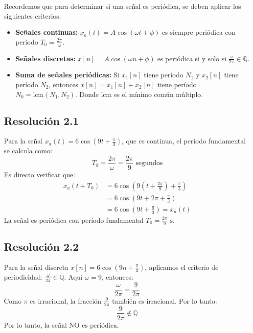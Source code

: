 \documentclass[
  11pt,
  letterpaper,
   addpoints,
  ]{exam}
\begin{document}
\begin{questions}
\begin{solution}

Recordemos que para determinar si una señal es periódica, se deben aplicar los siguientes criterios:

\begin{itemize}
\item \textbf{Señales continuas:} $x_a(t) = A\cos(\omega t + \phi)$ es siempre periódica con período $T_0 = \frac{2\pi}{\omega}$.
\item \textbf{Señales discretas:} $x[n] = A\cos(\omega n + \phi)$ es periódica si y solo si $\frac{\omega}{2\pi} \in \mathbb{Q}$.
\item \textbf{Suma de señales periódicas:} Si $x_1[n]$ tiene período $N_1$ y $x_2[n]$ tiene período $N_2$, entonces $x[n] = x_1[n] + x_2[n]$ tiene período $N_0 = \text{lcm}(N_1, N_2)$. Donde $\text{lcm}$ es el mínimo común múltiplo.
\end{itemize}
\subsection*{Resolución 2.1}

Para la señal $x_a(t) = 6\cos\!\left(9t+\tfrac{\pi}{3}\right)$, que es continua, el período fundamental se calcula como:
\begin{equation}
T_0 = \frac{2\pi}{\omega} = \frac{2\pi}{9} \text{ segundos}
\end{equation}
Es directo verificar que:
\begin{align}
x_a(t + T_0) &= 6\cos\!\left(9\left(t + \frac{2\pi}{9}\right) + \frac{\pi}{3}\right) \\
&= 6\cos\!\left(9t + 2\pi + \frac{\pi}{3}\right) \\
&= 6\cos\!\left(9t + \frac{\pi}{3}\right) = x_a(t)
\end{align}
La señal es periódica con período fundamental $\boxed{T_0 = \frac{2\pi}{9} \text{ s}}$.

\subsection*{Resolución 2.2}

Para la señal discreta $x[n] = 6\cos\!\left(9n+\tfrac{\pi}{3}\right)$, aplicamos el criterio de periodicidad: $\frac{\omega}{2\pi} \in \mathbb{Q}$. Aquí $\omega = 9$, entonces:
\begin{equation}
\frac{\omega}{2\pi} = \frac{9}{2\pi}
\end{equation}
Como $\pi$ es irracional, la fracción $\frac{9}{2\pi}$ también es irracional. Por lo tanto:
\begin{equation}
\frac{9}{2\pi} \notin \mathbb{Q}
\end{equation}
Por lo tanto, la señal $\boxed{\text{NO es periódica}}$.

\end{solution}
\end{questions}
\end{document}
